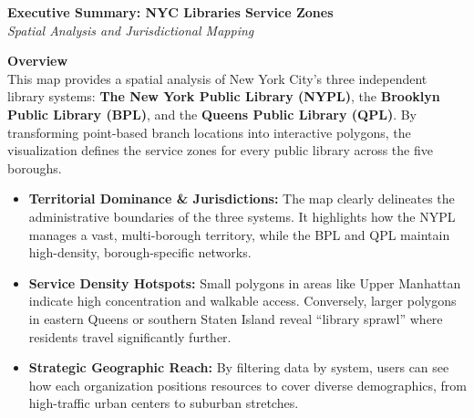 \documentclass[11pt]{article}
\begin{document}
	
	\begin{center}
		{\huge \textbf{Executive Summary: \newline NYC Libraries Service Zones}} \\
		\vspace{2mm}
		\textit{Spatial Analysis and Jurisdictional Mapping}
		\vspace{10mm}
	\end{center}
	
	\noindent \textbf{Overview} \\
	This map provides a spatial analysis of New York City’s three independent library systems: \textbf{The New York Public Library (NYPL)}, the \textbf{Brooklyn Public Library (BPL)}, and the \textbf{Queens Public Library (QPL)}. By transforming point-based branch locations into interactive polygons, the visualization defines the service zones for every public library across the five boroughs.
	
	\vspace{5mm}
	\begin{itemize}
		\item \textbf{Territorial Dominance \& Jurisdictions:} The map clearly delineates the administrative boundaries of the three systems. It highlights how the NYPL manages a vast, multi-borough territory, while the BPL and QPL maintain high-density, borough-specific networks.
		
		\item \textbf{Service Density Hotspots:} Small polygons in areas like Upper Manhattan indicate high concentration and walkable access. Conversely, larger polygons in eastern Queens or southern Staten Island reveal ``library sprawl'' where residents travel significantly further.
		
		\item \textbf{Strategic Geographic Reach:} By filtering data by system, users can see how each organization positions resources to cover diverse demographics, from high-traffic urban centers to suburban stretches.
	\end{itemize}
	
\end{document}
